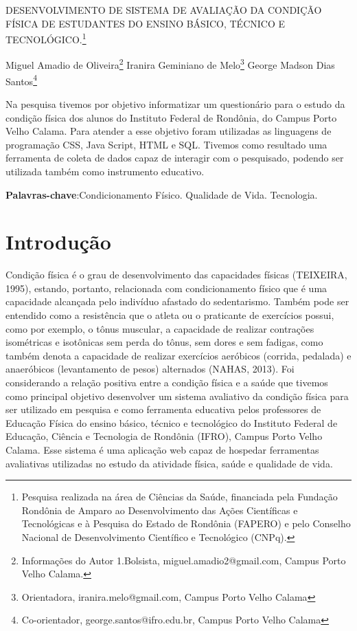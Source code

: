 \documentclass[article,12pt,onesidea,4paper,english,brazil]{abntex2}
\begin{document}
	
	
	\frenchspacing 
	
	\begin{center}
		\LARGE DESENVOLVIMENTO DE SISTEMA DE AVALIAÇÃO DA CONDIÇÃO FÍSICA DE ESTUDANTES DO ENSINO BÁSICO, TÉCNICO E TECNOLÓGICO.\footnote{Pesquisa realizada na área de Ciências da Saúde, financiada pela Fundação Rondônia de Amparo ao Desenvolvimento das Ações Científicas e Tecnológicas e à Pesquisa do Estado de Rondônia (FAPERO) e pelo Conselho Nacional de Desenvolvimento Científico e Tecnológico (CNPq).}
		
		\normalsize
		Miguel Amadio de Oliveira\footnote{Informações do Autor 1.Bolsista, miguel.amadio2@gmail.com, Campus Porto Velho Calama.} 
	Iranira Geminiano de Melo\footnote{Orientadora, iranira.melo@gmail.com, Campus Porto Velho Calama} 
	George Madson Dias Santos\footnote{Co-orientador, george.santos@ifro.edu.br, Campus Porto Velho Calama}  
	\end{center}
	
	\begin{resumoumacoluna}
		Na pesquisa tivemos por objetivo informatizar um questionário para o estudo da condição física dos alunos do Instituto Federal de Rondônia, do Campus Porto Velho Calama. Para atender a esse objetivo foram utilizadas as linguagens de programação CSS, Java Script, HTML e SQL. Tivemos como resultado uma ferramenta de coleta de dados capaz de interagir com o pesquisado, podendo ser utilizada também como instrumento educativo.
		
		\vspace{\onelineskip}
		
		\noindent
		\textbf{Palavras-chave}:Condicionamento Físico. Qualidade de Vida. Tecnologia.
	\end{resumoumacoluna}
	
	\section*{Introdução}
	
Condição física é o grau de desenvolvimento das capacidades físicas (TEIXEIRA, 1995), estando, portanto, relacionada com condicionamento físico que é uma capacidade alcançada pelo indivíduo afastado do sedentarismo. Também pode ser entendido como a resistência que o atleta ou o praticante de exercícios possui, como por exemplo, o tônus muscular, a capacidade de realizar contrações isométricas e isotônicas sem perda do tônus, sem dores e sem fadigas, como também denota a capacidade de realizar exercícios aeróbicos (corrida, pedalada) e anaeróbicos (levantamento de pesos) alternados (NAHAS, 2013).
Foi considerando a relação positiva entre a condição física e a saúde que tivemos como principal objetivo desenvolver um sistema avaliativo da condição física para ser utilizado em pesquisa e como ferramenta educativa pelos professores de Educação Física do ensino básico, técnico e tecnológico do Instituto Federal de Educação, Ciência e Tecnologia de Rondônia (IFRO), Campus Porto Velho Calama. Esse sistema é uma aplicação web capaz de hospedar ferramentas avaliativas utilizadas no estudo da atividade física, saúde e qualidade de vida.
	
\end{document}
